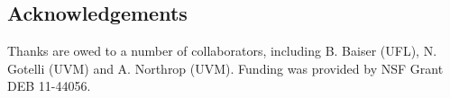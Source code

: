 \documentclass[a0,landscape]{a0poster}
\begin{document}
\begin{multicols}{4}
\color{DarkSlateGray} %





\nocite{*} %


\section*{Acknowledgements}

Thanks are owed to a number of collaborators, including B. Baiser
(UFL), N. Gotelli (UVM) and A. Northrop (UVM). Funding was provided by
NSF Grant DEB 11-44056. 


\end{multicols}
\end{document}
